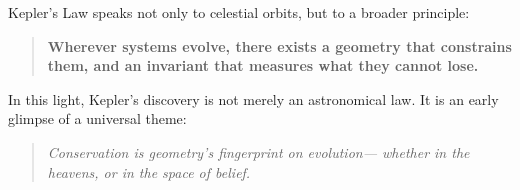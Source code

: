 \begin{tcolorbox}[colback=gray!5!white, colframe=gray!50!black, title={Summary}]
Kepler’s Law speaks not only to celestial orbits,  
but to a broader principle:

\begin{quote}
\textbf{Wherever systems evolve, there exists a geometry that constrains them,  
and an invariant that measures what they cannot lose.}
\end{quote}
\end{tcolorbox}

In this light, Kepler’s discovery is not merely an astronomical law.  
It is an early glimpse of a universal theme:

\begin{quote}
\textit{Conservation is geometry’s fingerprint on evolution—  
whether in the heavens, or in the space of belief.}
\end{quote}
